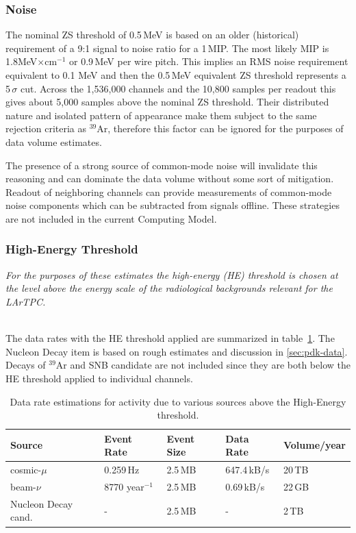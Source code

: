 \subsubsection{Noise}

The nominal ZS threshold of 0.5\,MeV is based on an older (historical) requirement of a
9:1 signal to noise ratio for a 1\,MIP. The most likely MIP is 1.8MeV$\times$cm$^{-1}$ or 0.9\,MeV
per wire pitch. This implies an RMS noise requirement equivalent to 0.1 MeV and then the 0.5\,MeV
equivalent ZS threshold represents a 5\,$\sigma$ cut. Across the 1,536,000 channels and the
10,800 samples per readout this gives about 5,000 samples above the nominal ZS threshold.
Their distributed nature and isolated pattern of appearance make them subject to the same rejection
criteria as $^{39}$Ar, therefore this factor can be ignored for the purposes of data volume estimates.

The presence of a strong source of common-mode noise will invalidate this reasoning and can dominate
the data volume without some sort of mitigation.  Readout of neighboring channels can provide measurements
of common-mode noise components which can be subtracted from signals offline.  These strategies are not
included in the current Computing Model.


\subsubsection{High-Energy Threshold}
\textit{For the purposes of these estimates the  high-energy (HE) threshold is chosen at the level above 
the energy scale of the radiological backgrounds relevant for the LArTPC.}

\ 
\\
\noindent
The data rates with the HE threshold applied are summarized in table~\ref{tab:he-volume}.
The Nucleon Decay item is based on rough estimates and discussion in \ref{sec:pdk-data}.
Decays of $^{39}$Ar and SNB candidate are not included since they are both below the HE
threshold applied to individual channels.

\begin{table}[ht!]
\centering
\begin{tabular}{| p{1.6in} | p{0.92in} | p{0.74in} | p{1in} | p{0.9in} |}		\hline	
Source & Event Rate & Event Size & Data Rate & Volume/year \\ \hline
cosmic-$\mu$ & 0.259\,Hz & 2.5\,MB & 647.4\,kB/s & 20\,TB \\ \hline
beam-$\nu$ & 8770 year$^{-1}$ & 2.5\,MB & 0.69\,kB/s & 22\,GB \\
\hline
Nucleon Decay cand. & - & 2.5\,MB & - & 2\,TB\\ \hline
\end{tabular}
\caption{Data rate estimations for activity due to
various sources above the High-Energy threshold.}
\label{tab:he-volume}
\end{table}

